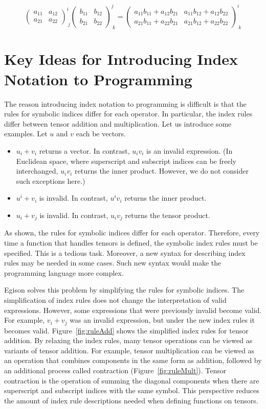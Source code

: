 $$
\begin{pmatrix}
a_{11} & a_{12} \\
a_{21} & a_{22}
\end{pmatrix}^{i}_{\ j}
\begin{pmatrix}
b_{11} & b_{12} \\
b_{21} & b_{22}
\end{pmatrix}^{j}_{\ k}
=
\begin{pmatrix}
a_{11} b_{11} + a_{12} b_{21} & a_{11} b_{12} + a_{12} b_{22} \\
a_{21} b_{11} + a_{22} b_{21} & a_{21} b_{12} + a_{22} b_{22}
\end{pmatrix}^{i}_{\ k}
$$

\section{Key Ideas for Introducing Index Notation to Programming}\label{tensor-idea}

The reason introducing index notation to programming is difficult is that the rules for symbolic indices differ for each operator.
In particular, the index rules differ between tensor addition and multiplication.
Let us introduce some examples.
Let $u$ and $v$ each be vectors.
\begin{itemize}
\item $u_{i} + v_{i}$ returns a vector. In contrast, $u_{i} v_{i}$ is an invalid expression.
(In Euclidean space, where superscript and subscript indices can be freely interchanged, $u_{i} v_{i}$ returns the inner product. However, we do not consider such exceptions here.)
\item $u^{i} + v_{i}$ is invalid. In contrast, $u^{i} v_{i}$ returns the inner product.
\item $u_{i} + v_{j}$ is invalid. In contrast, $u_{i} v_{j}$ returns the tensor product.
\end{itemize}
As shown, the rules for symbolic indices differ for each operator.
Therefore, every time a function that handles tensors is defined, the symbolic index rules must be specified.
This is a tedious task.
Moreover, a new syntax for describing index rules may be needed in some cases.
Such new syntax would make the programming language more complex.

Egison solves this problem by simplifying the rules for symbolic indices.
The simplification of index rules does not change the interpretation of valid expressions.
However, some expressions that were previously invalid become valid.
For example, $v_{i} + v_{j}$ was an invalid expression, but under the new index rules it becomes valid.
Figure~\ref{fig:ruleAdd} shows the simplified index rules for tensor addition.
By relaxing the index rules, many tensor operations can be viewed as variants of tensor addition.
For example, tensor multiplication can be viewed as an operation that combines components in the same form as addition, followed by an additional process called contraction (Figure~\ref{fig:ruleMult}).
Tensor contraction is the operation of summing the diagonal components when there are superscript and subscript indices with the same symbol.
This perspective reduces the amount of index rule descriptions needed when defining functions on tensors.

